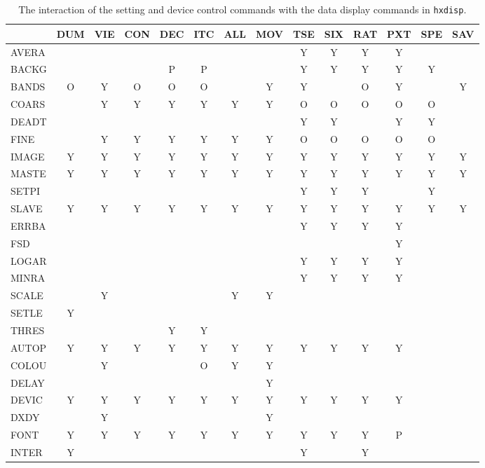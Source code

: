 \begin{table}
\caption{\label{interact} The interaction of the setting and device control
commands with the data display commands in {\tt hxdisp}.} {\small
\begin{center}
\begin{tabular}{|l|*{7}{c}|*{4}{c}|*{2}{c}|} \hline
& DUM & VIE & CON & DEC & ITC & ALL & MOV & TSE & SIX & RAT & PXT & SPE
& SAV \\
\hline
AVERA & & & & & & & & Y & Y & Y & Y & & \\
BACKG & & & & P & P & & & Y & Y & Y & Y & Y & \\
BANDS & O & Y & O & O & O & & Y & Y & & O & Y & & Y \\
COARS & & Y & Y & Y & Y & Y & Y & O & O & O & O & O & \\ 
DEADT & & & & & & & & Y & Y & & Y & Y & \\ 
FINE & & Y & Y & Y & Y & Y & Y & O & O & O & O & O & \\ 
IMAGE & Y & Y & Y & Y & Y & Y & Y & Y & Y & Y & Y & Y & Y \\ 
MASTE & Y & Y & Y & Y & Y & Y & Y & Y & Y & Y & Y & Y & Y \\
SETPI & & & & & & & & Y & Y & Y & & Y & \\ 
SLAVE & Y & Y & Y & Y & Y & Y & Y & Y & Y & Y & Y & Y & Y \\
\hline
ERRBA & & & & & & & & Y & Y & Y & Y & & \\ 
FSD & & & & & & & & & & & Y & & \\ 
LOGAR & & & & & & & & Y & Y & Y & Y & & \\ 
MINRA & & & & & & & & Y & Y & Y & Y & & \\ 
SCALE & & Y & & & & Y & Y & & & & & & \\ 
SETLE & Y & & & & & & & & & & & & \\ 
THRES & & & & Y & Y & & & & & & & & \\
\hline
AUTOP & Y & Y & Y & Y & Y & Y & Y & Y & Y & Y & Y & & \\ 
COLOU & & Y & & & O & Y & Y & & & & & & \\ 
DELAY & & & & & & & Y & & & & & & \\ 
DEVIC & Y & Y & Y & Y & Y & Y & Y & Y & Y & Y & Y & & \\ 
DXDY & & Y & & & & & Y & & & & & & \\ 
FONT & Y & Y & Y & Y & Y & Y & Y & Y & Y & Y & P & & \\ 
INTER & Y & & & & & & & Y & & Y & & & \\ 

\end{tabular}
\end{center}}
\end{table}
